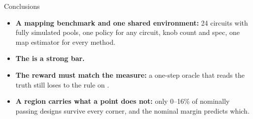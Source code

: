 
\begin{frame}{Conclusions}
  \begin{itemize}
    \item \textbf{A mapping benchmark and one shared environment:} 24 circuits with fully simulated pools, one policy
      for any circuit, knob count and spec, one map estimator for every method.
    \item \textbf{The  is a strong bar.} 
    \item \textbf{The reward must match the measure:} a one-step oracle that reads the truth still loses to the rule
      on \passfail{}.
    \item \textbf{A region carries what a point does not:} only 0--16\% of nominally passing designs survive every
      corner, and the nominal margin predicts which.
  \end{itemize}
\end{frame}
